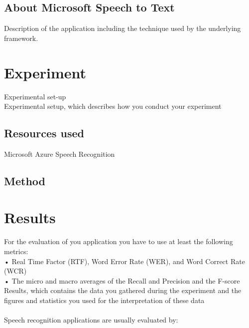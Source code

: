 \documentclass{article}
\begin{document}
\subsection{About Microsoft Speech to Text}
Description of the application including the technique used by the underlying framework.

\section{Experiment}
Experimental set-up \\
Experimental setup, which describes how you conduct your experiment

\subsection{Resources used}
Microsoft Azure Speech Recognition

\subsection{Method}

\section{Results}
For the evaluation of you application you have to use at least the following metrics: \\
• Real Time Factor (RTF), Word Error Rate (WER), and Word Correct Rate (WCR) \\
• The micro and macro averages of the Recall and Precision and the F-score \\

Results, which contains the data you gathered during the experiment and the
figures and statistics you used for the interpretation of these data \\
\\
Speech recognition applications are usually evaluated by:
\end{document}
